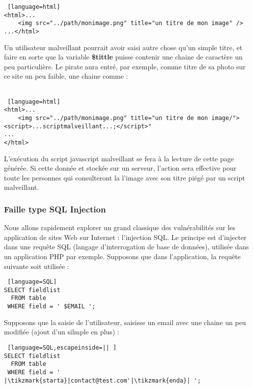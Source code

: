 \begin{lstlisting} [language=html]
<html>...
	<img src="../path/monimage.png" title="un titre de mon image" />
...</html>
\end{lstlisting}

Un utilisateur malveillant pourrait avoir saisi autre chose qu'un simple titre, et faire en sorte que la variable \textbf{\$tittle} puisse contenir une chaine de caractère un peu particulière. Le pirate aura entré, par exemple, comme titre de sa photo sur ce site un peu faible, une chaine comme  : \\
\\
\begin{lstlisting} [language=html]
<html>...
	<img src="../path/monimage.png" title="un titre de mon image/"><script>...scriptmalveillant...;</script>" 
...
</html>
\end{lstlisting}
L'exécution du script javascript malveillant se fera à la lecture de cette page générée. Si cette donnée et stockée sur un serveur, l'action sera effective pour toute les personnes qui consulteront la l'image avec son titre piégé par un script malveillant.

\subsubsection{Faille type SQL Injection}

Nous allons rapidement explorer un grand classique des vulnérabilités sur les application de sites Web sur Internet : l'injection SQL. Le principe est d'injecter dans une requête SQL (langage d'interrogation de base de données), utilisée dans un application PHP par exemple. Supposons que dans l'application, la requête suivante soit utilisée : \\
\begin{lstlisting} [language=SQL]
SELECT fieldlist
  FROM table 
 WHERE field = ' $EMAIL ';
\end{lstlisting}
Supposons que la saisie de l'utilisateur, saisisse un email avec une chaine un peu modifiée (ajout d'un silmple  en plus)  :
\\
\begin{lstlisting} [language=SQL,escapeinside=|| ]
SELECT fieldlist
  FROM table 
 WHERE field = '  |\tikzmark{starta}|contact@test.com'|\tikzmark{enda}| ';
\end{lstlisting}



